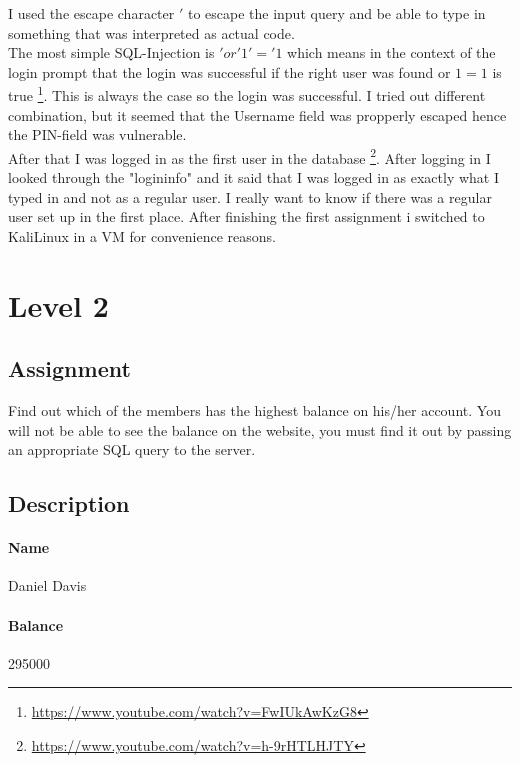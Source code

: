 \documentclass{scrartcl}
\newcommand\solution[2]{{\paragraph{#1}#2}}
\begin{document}
	I used the escape character $'$ to escape the input query and be able to type in something that was interpreted as actual code. \\
	The most simple SQL-Injection is $ ' or '1' = '1 $ which means in the context of the login prompt that the login was successful if the right user was found or $1=1$ is true \footnote{\url{https://www.youtube.com/watch?v=FwIUkAwKzG8}}. This is always the case so the login was successful. I tried out different combination, but it seemed that the Username field was propperly escaped hence the PIN-field was vulnerable.\\
	After that I was logged in as the first user in the  database \footnote{\url{https://www.youtube.com/watch?v=h-9rHTLHJTY}}. After logging in I looked through the "logininfo" and it said that I was logged in as exactly what I typed in and not as a regular user.
	I really want to know if there was a regular user set up in the first place.
	After finishing the first assignment i switched to KaliLinux in a VM for convenience reasons.
	
	\section*{Level 2}
	\subsection*{Assignment}
	Find out which of the members has the highest balance on his/her account. You will not be able to see the balance on the website, you must find it out by passing an appropriate SQL query to the server.
	
	\subsection*{Description}
	\solution{Name}{Daniel Davis}
	\solution{Balance}{295000}
	
\end{document}
